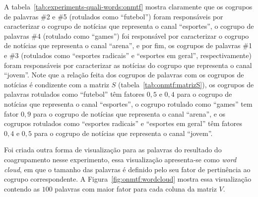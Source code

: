 \documentclass[
    12pt,                %
    oneside,            %
    a4paper,            %
    english,            %
    brazil                %
    ]{abntex2ppgsi}
\begin{document}
A tabela~\ref{tab:experiments-quali-words:onmtf} mostra claramente que os cogrupos de palavras \#2 e \#5 (rotulados como ``futebol'') foram responsáveis por caracterizar o cogrupo de notícias que representa o canal ``esportes'', o cogrupo de palavras \#4 (rotulado como ``games'') foi responsável por caracterizar o cogrupo de notícias que representa o canal ``arena'', e por fim, os cogrupos de palavras \#1 e \#3 (rotulados como ``esportes radicais'' e ``esportes em geral'', respectivamente) foram responsáveis por caracterizar as notícias do cogrupo que representa o canal ``jovem''.
Note que a relação feita dos cogrupos de palavras com os cogrupos de notícias é condizente com a matriz $S$ (tabela~\ref{tab:onmtf:matrizS}), os cogrupos de palavras rotulados como ``futebol'' têm fatores $0,5$ e $0,4$ para o cogrupo de notícias que representa o canal ``esportes'', o cogrupo rotulado como ``games'' tem fator $0,9$ para o cogrupo de notícias que representa o canal ``arena'', e os cogrupos rotulados como ``esportes radicais'' e ``esportes em geral'' têm fatores $0,4$ e $0,5$ para o cogrupo de notícias que representa o canal ``jovem''.

Foi criada outra forma de visualização para as palavras do resultado do coagrupamento nesse experimento, essa visualização apresenta-se como \textit{word cloud}, em que o tamanho das palavras é definido pelo seu fator de pertinência ao cogrupo correspondente.
A Figura~\ref{fig:onmtf:wordcloud} mostra essa visualização contendo as $100$ palavras com maior fator para cada coluna da matriz $V$.
\end{document}
